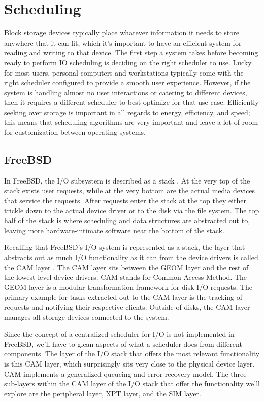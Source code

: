 \documentclass[10pt,draftclsnofoot,onecolumn]{IEEEtran}
\begin{document}
\section{Scheduling}
\label{sec:Scheduling}
\par Block storage devices typically place whatever information it needs to store anywhere that it can fit, which it's important to have an efficient system for reading and writing to that device.
The first step a system takes before becoming ready to perform IO scheduling is deciding on the right scheduler to use.
Lucky for most users, personal computers and workstations typically come with the right scheduler configured to provide a smooth user experience.
However, if the system is handling almost no user interactions or catering to different devices, then it requires a different scheduler to best optimize for that use case.
Efficiently seeking over storage is important in all regards to energy, efficiency, and speed; this means that scheduling algorithms are very important and leave a lot of room for customization between operating systems.

\subsection{FreeBSD}
\label{sub:Scheduling FreeBSD}
In FreeBSD, the I/O subsystem is described as a stack \cite{bsd:2}.
At the very top of the stack exists user requests, while at the very bottom are the actual media devices that service the requests.
After requests enter the stack at the top they either trickle down to the actual device driver or to the disk via the file system.
The top half of the stack is where scheduling and data structures are abstracted out to, leaving more hardware-intimate software near the bottom of the stack.

\par Recalling that FreeBSD's I/O system is represented as a stack, the layer that abstracts out as much I/O functionality as it can from the device drivers is called the CAM layer \cite{bsd:1}.
The CAM layer sits between the GEOM layer and the rest of the lowest-level device drivers.
CAM stands for Common Access Method.
The GEOM layer is a modular transformation framework for disk-I/O requests.
The primary example for tasks extracted out to the CAM layer is the tracking of requests and notifying their respective clients.
Outside of disks, the CAM layer manages all storage devices connected to the system.

\par Since the concept of a centralized scheduler for I/O is not implemented in FreeBSD, we'll have to glean aspects of what a scheduler does from different components.
The layer of the I/O stack that offers the most relevant functionality is this CAM layer, which surprisingly sits very close to the physical device layer.
CAM implements a generalized queueing and error recovery model.
The three sub-layers within the CAM layer of the I/O stack that offer the functionality we'll explore are the peripheral layer, XPT layer, and the SIM layer.
\end{document}
